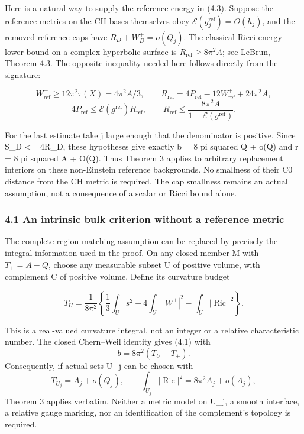 \documentclass[
  10pt,
]{article}
\begin{document}
Here is a natural way to supply the reference energy in (4.3). Suppose
the reference metrics on the CH bases themselves obey
\(\mathcal E(g_j^{\mathrm{ref}})=O(h_j)\), and the removed reference
caps have \(R_D+W_D^+=o(Q_j)\). The classical Ricci-energy lower bound
on a complex-hyperbolic surface is \(R_{\mathrm{ref}}\ge8\pi^2A\); see
\href{https://arxiv.org/html/math/0003068}{LeBrun, Theorem 4.3}. The
opposite inequality needed here follows directly from the signature:

\[
 W_{\mathrm{ref}}^+\ge12\pi^2\tau(X)=4\pi^2A/3,\qquad
 R_{\mathrm{ref}}=4P_{\mathrm{ref}}-12W_{\mathrm{ref}}^+
                                                    +24\pi^2A,
\] \[
 4P_{\mathrm{ref}}\le
       \mathcal E(g^{\mathrm{ref}})R_{\mathrm{ref}},
 \qquad
 R_{\mathrm{ref}}\le
       \frac{8\pi^2A}{1-\mathcal E(g^{\mathrm{ref}})}.    \tag{4.6}
\]

For the last estimate take j large enough that the denominator is
positive. Since S\_D \textless= 4R\_D, these hypotheses give exactly b =
8 pi squared Q + o(Q) and r = 8 pi squared A + O(Q). Thus Theorem 3
applies to arbitrary replacement interiors on these non-Einstein
reference backgrounds. No smallness of their C0 distance from the CH
metric is required. The cap smallness remains an actual assumption, not
a consequence of a scalar or Ricci bound alone.

\hypertarget{an-intrinsic-bulk-criterion-without-a-reference-metric}{%
\subsubsection{4.1 An intrinsic bulk criterion without a reference
metric}\label{an-intrinsic-bulk-criterion-without-a-reference-metric}}

The complete region-matching assumption can be replaced by precisely the
integral information used in the proof. On any closed member M with
\(T_+=A-Q\), choose any measurable subset U of positive volume, with
complement C of positive volume. Define its curvature budget

\[
 T_U=\frac1{8\pi^2}\left\{\frac13\int_U s^2
                   +4\int_U|W^+|^2-\int_U|\operatorname{Ric}|^2\right\}.
                                                               \tag{4.7}
\]

This is a real-valued curvature integral, not an integer or a relative
characteristic number. The closed Chern--Weil identity gives (4.1) with
\[
                  b=8\pi^2(T_U-T_+).
\] Consequently, if actual sets U\_j can be chosen with \[
 T_{U_j}=A_j+o(Q_j),\qquad
 \int_{U_j}|\operatorname{Ric}|^2=8\pi^2A_j+o(A_j),        \tag{4.8}
\] Theorem 3 applies verbatim. Neither a metric model on U\_j, a smooth
interface, a relative gauge marking, nor an identification of the
complement's topology is required.
\end{document}
